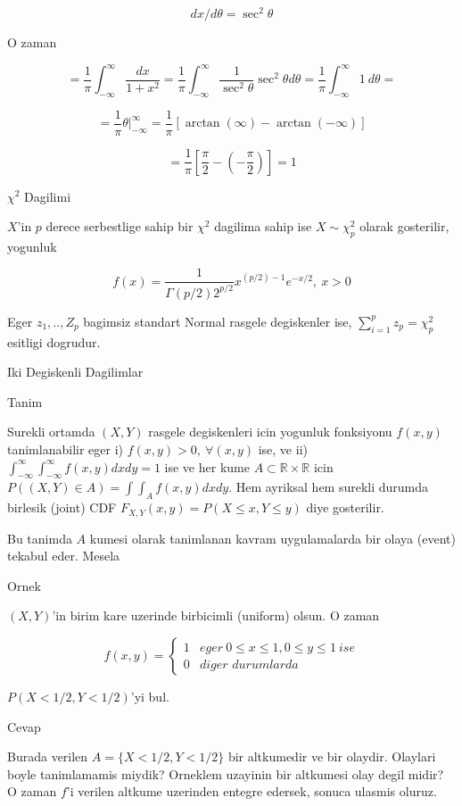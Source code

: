 \documentclass[12pt,fleqn]{article}\usepackage{../common}
\begin{document}
\[ dx / d\theta = \sec^2\theta \]

O zaman 

\[ =
\frac{ 1}{\pi} \int _{ -\infty}^{\infty} \frac{ dx}{1 + x^2}   =
\frac{ 1}{\pi} \int _{ -\infty}^{\infty}  \frac{ 1}{\sec^2\theta}\sec^2\theta d\theta = 
\frac{ 1}{\pi} \int _{ -\infty}^{\infty}  1 \ d\theta = 
 \]

\[ = 
\frac{ 1}{\pi} \theta | _{ -\infty}^{\infty}   = 
\frac{ 1}{\pi} [\arctan(\infty) - \arctan(-\infty)]
 \]

\[ =
\frac{ 1}{\pi} [\frac{ \pi}{2} - (-\frac{ \pi}{2}) ] = 1
 \]


$\chi^2$ Dagilimi

$X$'in $p$ derece serbestlige sahip bir $\chi^2$ dagilima sahip ise $X \sim
\chi^2_p$ 
olarak gosterilir, yogunluk 

\[ f(x) = \frac{ 1}{\Gamma(p/2) 2^{p/2}} x^{(p/2) - 1} e^{-x/2 }, \ x > 0 \]

Eger $z_1, .. , Z_p$ bagimsiz standart Normal rasgele degiskenler ise,
$\sum _{ i=1}^{p} z_p = \chi^2_p$ esitligi dogrudur. 

Iki Degiskenli Dagilimlar 

Tanim

Surekli ortamda $(X,Y)$ rasgele degiskenleri icin yogunluk fonksiyonu
$f(x,y)$ tanimlanabilir eger i) $f(x,y) > 0, \ \forall (x,y)$ ise, ve ii)
$\int _{ -\infty}^{\infty} \int _{ -\infty}^{\infty} f(x,y) dx dy = 1$ ise ve her kume $A \subset \mathbb{R} \times \mathbb{R}$ icin 
$P((X,Y) \in A) = \int
\int_A f(x,y) dx dy$. Hem ayriksal hem surekli durumda 
birlesik (joint) CDF $F_{X,Y}(x,y) = P (X \le x, Y \le y)$ diye
gosterilir. 

Bu tanimda $A$ kumesi olarak tanimlanan kavram uygulamalarda bir olaya
(event) tekabul eder. Mesela

Ornek

$(X,Y)$'in birim kare uzerinde birbicimli (uniform) olsun. O zaman 

\[ 
f(x,y) =
\left\{ \begin{array}{ll}
1 & \textit{eger} \ 0 \le x \le 1, 0 \le y \le 1 \ ise\\
0 & \textit{diger durumlarda}
\end{array} \right.
 \]

$P(X < 1/2, Y < 1/2)$'yi bul. 

Cevap

Burada verilen $A = \{ X < 1/2, Y < 1/2\}$ bir altkumedir ve bir
olaydir. Olaylari boyle tanimlamamis miydik? Orneklem uzayinin bir
altkumesi olay degil midir? O zaman $f$'i verilen altkume uzerinden entegre
edersek, sonuca ulasmis oluruz. 
\end{document}
